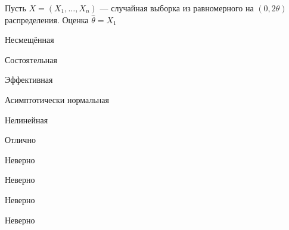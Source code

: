 
\begin{question}
Пусть \(X = (X_1, \ldots , X_n)\) — случайная выборка из равномерного
на \((0, 2\theta)\) распределения. Оценка \(\hat{\theta} = X_1\)
\begin{answerlist}
  \item Несмещённая
  \item Состоятельная
  \item Эффективная
  \item Асимптотически нормальная
  \item Нелинейная
\end{answerlist}
\end{question}

\begin{solution}
\begin{answerlist}
  \item Отлично
  \item Неверно
  \item Неверно
  \item Неверно
  \item Неверно
\end{answerlist}
\end{solution}

